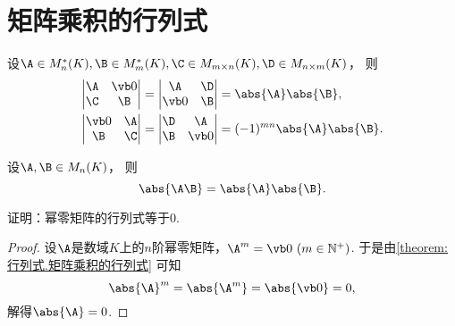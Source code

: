 \section{矩阵乘积的行列式}
\begin{lemma}
设\(\A\in M_n^*(K),
\B\in M_m^*(K),
\C\in M_{m\times n}(K),
\D\in M_{n\times m}(K)\)，
则\begin{align}
	\begin{vmatrix}
		\A & \vb0 \\
		\C & \B
	\end{vmatrix}
	&= \begin{vmatrix}
		\A & \D \\
		\vb0 & \B
	\end{vmatrix}
	= \abs{\A} \abs{\B}, \label{equation:行列式.广义三角阵的行列式1} \\
	\begin{vmatrix}
		\vb0 & \A \\
		\B & \C
	\end{vmatrix}
	&= \begin{vmatrix}
		\D & \A \\
		\B & \vb0
	\end{vmatrix}
	= (-1)^{mn} \abs{\A} \abs{\B}. \label{equation:行列式.广义三角阵的行列式2}
\end{align}
\end{lemma}

\begin{theorem}[矩阵乘积的行列式定理]\label{theorem:行列式.矩阵乘积的行列式}
设\(\A,\B\in M_n(K)\)，
则\begin{equation}
	\abs{\A \B} = \abs{\A} \abs{\B}.
\end{equation}
\end{theorem}

\begin{example}\label{example:幂零矩阵.幂零矩阵的行列式}
证明：幂零矩阵的行列式等于\(0\).
\begin{proof}
设\(\A\)是数域\(K\)上的\(n\)阶幂零矩阵，\(\A^m = \vb0\ (m\in\mathbb{N}^+)\).
于是由\cref{theorem:行列式.矩阵乘积的行列式} 可知\[
	\abs{\A}^m
	= \abs{\A^m}
	= \abs{\vb0}
	= 0,
\]
解得\(\abs{\A} = 0\).
\end{proof}
\end{example}

